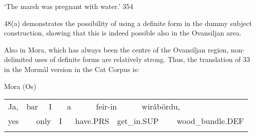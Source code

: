 \begin{styleTranslation}
‘The marsh was pregnant with water.’ 354

\end{styleTranslation}

\begin{styleBodyTextFirst}
48(a) demonstrates the possibility of using a definite form in the dummy subject construction, showing that this is indeed possible also in the Ovansiljan area. 

\end{styleBodyTextFirst}

\begin{styleBodytextC}
Also in Mora, which has always been the centre of the Ovansiljan region, non-delimited uses of definite forms are relatively strong. Thus, the translation of 33 in the Mormål version in the Cat Corpus is:

\end{styleBodytextC}


\begin{listWWNumileveli}
\item 

\begin{styleExample}
Mora (Os)

\end{styleExample}

\end{listWWNumileveli}

\begin{tabular}{llllllllllll}
\lsptoprule
Ja, & \multicolumn{2}{l}{bar

} & \multicolumn{2}{l}{I

} & \multicolumn{2}{l}{a

} & \multicolumn{2}{l}{feir-in

} & \multicolumn{2}{l}{wiråbördu,

} & \\
\multicolumn{2}{l}{yes

} & \multicolumn{2}{l}{only

} & \multicolumn{2}{l}{I

} & \multicolumn{2}{l}{have.PRS

} & \multicolumn{2}{l}{get\_in.SUP

} & \multicolumn{2}{l}{wood\_bundle.DEF

}\\
\lspbottomrule
\end{tabular}

